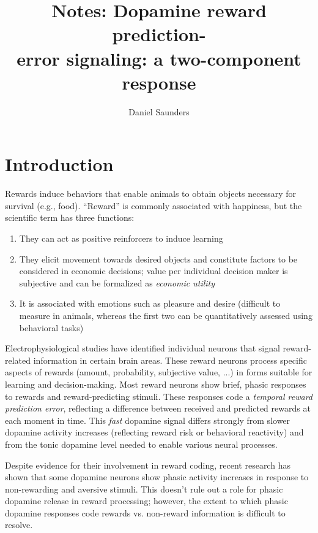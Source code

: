 \documentclass{article}
\title{Notes: Dopamine reward prediction-\\error signaling: a two-component response}
\author{Daniel Saunders}
\numberwithin{equation}{section}
\begin{document}
\maketitle

\section{Introduction}

Rewards induce behaviors that enable animals to obtain objects necessary for survival (e.g., food). ``Reward'' is commonly associated with happiness, but the scientific term has three functions:

\begin{enumerate}
\item They can act as positive reinforcers to induce learning
\item They elicit movement towards desired objects and constitute factors to be considered in economic decisions; value per individual decision maker is subjective and can be formalized as \textit{economic utility}
\item It is associated with emotions such as pleasure and desire (difficult to measure in animals, whereas the first two can be quantitatively assessed using behavioral tasks)
\end{enumerate}

Electrophysiological studies have identified individual neurons that signal reward-related information in certain brain areas. These reward neurons process specific aspects of rewards (amount, probability, subjective value, ...) in forms suitable for learning and decision-making. Most reward neurons show brief, phasic responses to rewards and reward-predicting stimuli. These responses code a \textit{temporal reward prediction error}, reflecting a difference between received and predicted rewards at each moment in time. This \textit{fast} dopamine signal differs strongly from slower dopamine activity increases (reflecting reward risk or behavioral reactivity) and from the tonic dopamine level needed to enable various neural processes.

Despite evidence for their involvement in reward coding, recent research has shown that some dopamine neurons show phasic activity increases in response to non-rewarding and aversive stimuli. This doesn't rule out a role for phasic dopamine release in reward processing; however, the extent to which phasic dopamine responses code rewards vs. non-reward information is difficult to resolve.
\end{document}
